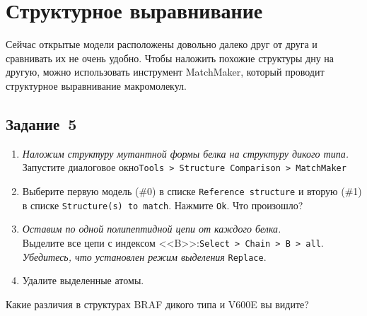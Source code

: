 \section{Структурное выравнивание}
Сейчас открытые модели расположены довольно далеко друг от друга и сравнивать их не очень удобно. Чтобы наложить похожие структуры дну на другую, можно использовать инструмент MatchMaker, который проводит структурное выравнивание макромолекул.

\subsection*{Задание~5}
\begin{enumerate}
    \item \textit{Наложим структуру мутантной формы белка на структуру дикого типа.}\\
    Запустите диалоговое окно\quad\texttt{Tools~> Structure~Comparison > Match\-Maker}
    
    \item Выберите первую модель (\#0) в списке \texttt{Reference structure} и вторую (\#1) в списке 
    \texttt{Structure(s) to match}. Нажмите \texttt{Ok}. Что произошло?
    
    \item \textit{Оставим по одной полипептидной цепи от каждого белка.} \\
    Выделите все цепи с индексом <<B>>:\quad\texttt{Select~> Chain~> B~> all}.\quad
    \textit{Убедитесь, что установлен режим выделения} \texttt{Replace}.
    
    \item Удалите выделенные атомы.
    
\end{enumerate}

Какие различия в структурах BRAF дикого типа и V600E вы видите?
